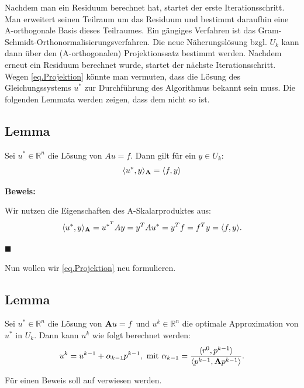 Nachdem man ein Residuum berechnet hat, startet der erste Iterationsschritt. Man erweitert seinen Teilraum um das Residuum und bestimmt daraufhin eine A-orthogonale Basis dieses Teilraumes. Ein gängiges Verfahren ist das Gram-Schmidt-Orthonormalisierungsverfahren. Die neue Näherungslösung bzgl. $U_{k}$ kann dann über den (A-orthogonalen) Projektionssatz bestimmt werden. Nachdem erneut ein Residuum berechnet wurde, startet der nächste Iterationsschritt.\\
Wegen \autoref{eq.Projektion} könnte man vermuten, dass die Lösung des Gleichungssystems $u^{*}$ zur Durchführung des Algorithmus bekannt sein muss. Die folgenden Lemmata werden zeigen, dass dem nicht so ist.

\subsection{Lemma}
Sei $u^{*} \in \mathbb{R}^{n}$ die Lösung von $Au = f$. Dann gilt für ein $y \in U_{k}$:
\begin{equation}
\langle u^{*}, y \rangle _{{\textbf{A}}} = \langle f, y \rangle
\end{equation}

\textbf{Beweis:}

Wir nutzen die Eigenschaften des A-Skalarproduktes aus:
\begin{equation}
\langle u^{*}, y \rangle _{{\textbf{A}}} = u^{{*}^{T}}Ay = y^{T}Au^{*} = y^{T}f = f^{T}y = \langle f, y \rangle. \notag
\end{equation}
\begin{flushright}
$\blacksquare$
\end{flushright}

Nun wollen wir \autoref{eq.Projektion} neu formulieren.

\subsection{Lemma}
Sei $u^{*} \in \mathbb{R}^{n}$ die Lösung von ${\textbf{A}}u = f$ und $u^{k} \in \mathbb{R}^{n}$ die optimale Approximation von $u^{*}$ in $U_{k}$. Dann kann $u^{k}$ wie folgt berechnet werden:
\begin{equation}
u^{k} = u^{k-1} + \alpha_{k-1}p^{k-1}, \textnormal{ mit } \alpha_{k-1} = \frac {\langle r^{0}, p^{k-1} \rangle} {\langle {p^{k-1},  {\textbf{A}} p^{k-1}} \rangle}.\label{eq.Alpha}
\end{equation}

Für einen Beweis soll auf \cite[S. 569]{DR08} verwiesen werden.

